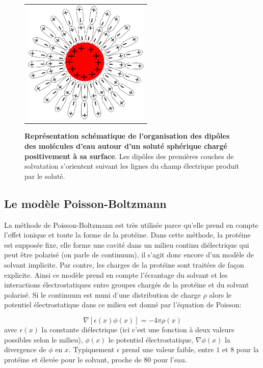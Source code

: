   \begin{figure}[!htbp]
     \centering
     \begin{tabular}{c}
       \includegraphics[width=6cm]{figure/ecrantage.png} &
     \end{tabular}
     
     \caption{\textbf{Représentation schématique de l'organisation des dipôles des molécules d'eau autour d'un soluté sphérique chargé positivement à sa surface}. Les dipôles des premières couches de solvatation s'orientent suivant les lignes du champ électrique produit par le soluté.}
\label{graph:ecrantage}
   \end{figure}
   
\subsection{Le modèle Poisson-Boltzmann}
La méthode de Poisson-Boltzmann est très utilisée parce qu'elle prend en compte l'effet ionique et toute la forme de la protéine. Dans cette méthode, la protéine est supposée fixe, elle forme une cavité dans un milieu continu diélectrique qui peut être polarisé (on parle de continuum), il s'agit donc encore d'un modèle de solvant implicite. Par contre, les charges de la protéine sont traitées de façon explicite. Ainsi ce modèle prend en compte l'écrantage du solvant et les interactions électrostatiques entre groupes chargés de la protéine et du solvant polarisé. Si le continuum est muni d'une distribution de charge $\rho$ alors le potentiel électrostatique dans ce milieu est donné par l'équation de Poisson:

\begin{equation}
  \label{eq:poisson}
  \nabla [ \epsilon(x) \phi(x)] = - 4 \pi \rho(x)   
\end{equation}
avec $\epsilon(x)$ la constante diélectrique (ici c'est une fonction à deux valeurs possibles selon le milieu), $\phi (x)$ le potentiel électrostatique, $\nabla \phi(x)$ la divergence de $\phi$ en $x$.
Typiquement $\epsilon$ prend une valeur faible, entre $1$ et $8$ pour la protéine et élevée pour le solvant, proche de $80$ pour l'eau.

